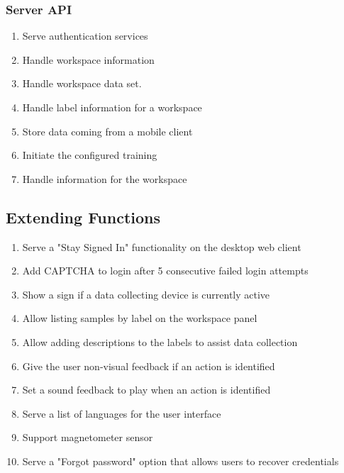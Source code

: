 \subsubsection{Server API}
\begin{enumerate}[resume*]
    \item \label{itm:authentication}Serve authentication services
    \item \label{itm:handle-workspace}Handle workspace information
    \item Handle \gls{workspace} data set.
    \item Handle \gls{label} information for a workspace
    \item Store data coming from a mobile client
    \item Initiate the configured  training
    \item Handle  information for the workspace
\end{enumerate}

\subsection{Extending Functions}
\begin{enumerate}[resume*]
    \item \label{itm:stay-signed}Serve a "Stay Signed In" functionality on the desktop web client
    \item \label{itm:CAPTCHA}Add \gls{CAPTCHA} to login after 5 consecutive failed login attempts
    \item \label{itm:active-sign}Show a sign if a data collecting device is currently active
    \item \label{itm:filter-by-label}Allow listing samples by \gls{label} on the \gls{workspace} panel
    \item \label{itm:label-description}Allow adding descriptions to the labels to assist data collection
    \item \label{itm:nonvisual-feedback} Give the user non-visual feedback if an action is identified
    \item \label{itm:sound-feedback}Set a sound feedback to play when an action is identified
    \item \label{itm:language}Serve a list of languages for the user interface
    \item \label{itm:magnetometer}Support \gls{magnetometer} \gls{sensor}
    \item \label{itm:forgot-password}Serve a "Forgot password" option that allows users to recover credentials
\end{enumerate}